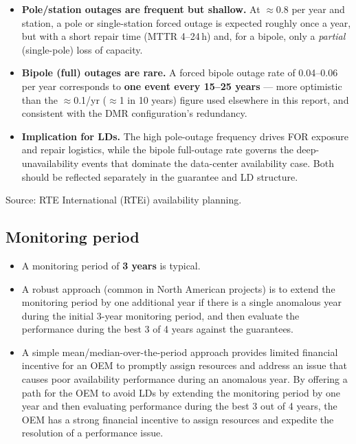 \begin{itemize}\setlength{\itemsep}{0.25em}
  \item \textbf{Pole/station outages are frequent but shallow.} At
        $\approx$0.8 per year and station, a pole or single-station forced outage
        is expected roughly once a year, but with a short repair time
        (MTTR 4--24\,h) and, for a bipole, only a \emph{partial} (single-pole)
        loss of capacity.
  \item \textbf{Bipole (full) outages are rare.} A forced bipole outage rate of
        0.04--0.06 per year corresponds to \textbf{one event every 15--25
        years} --- more optimistic than the $\approx$0.1/yr ($\approx$1 in 10
        years) figure used elsewhere in this report, and consistent with the DMR
        configuration's redundancy.
  \item \textbf{Implication for LDs.} The high pole-outage frequency drives FOR
        exposure and repair logistics, while the bipole full-outage rate governs
        the deep-unavailability events that dominate the data-center availability
        case. Both should be reflected separately in the guarantee and LD
        structure.
\end{itemize}

{\footnotesize Source: RTE International (RTEi) availability
planning.}

\subsection{Monitoring period}
\begin{itemize}\setlength{\itemsep}{0.2em}
      \item A monitoring period of \textbf{3 years} is typical.
      \item A robust approach (common in North American projects) is to extend the monitoring period by one additional year if there 
            is a single anomalous year during the initial 3-year monitoring period, and then evaluate the performance during the 
            best 3 of 4 years against the guarantees.
      \item A simple mean/median-over-the-period approach provides limited financial incentive for an OEM to promptly 
            assign resources and address an issue that causes poor availability performance during an anomalous year. 
            By offering a path for the OEM to avoid LDs by extending the monitoring period by one year and then evaluating 
            performance during the best 3 out of 4 years, the OEM has a strong financial incentive to assign resources and expedite the 
            resolution of a performance issue.
\end{itemize}
